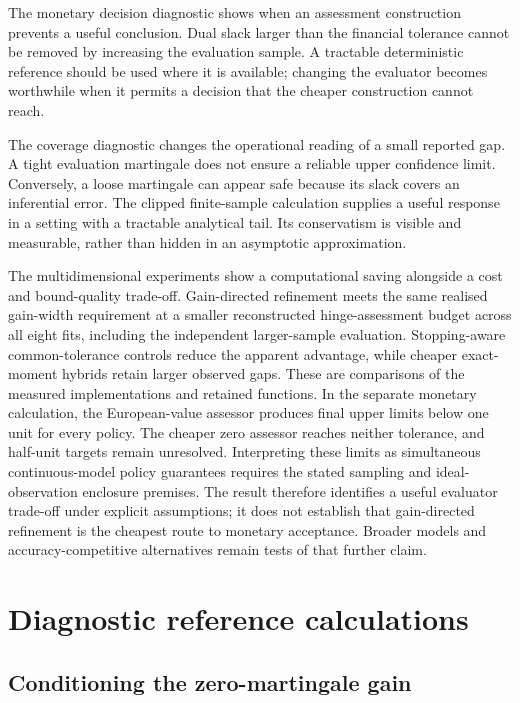 \documentclass[11pt]{article}
\begin{document}
The monetary decision diagnostic shows when an assessment construction prevents a useful conclusion. Dual slack larger than the financial tolerance cannot be removed by increasing the evaluation sample. A tractable deterministic reference should be used where it is available; changing the evaluator becomes worthwhile when it permits a decision that the cheaper construction cannot reach.

The coverage diagnostic changes the operational reading of a small reported gap. A tight evaluation martingale does not ensure a reliable upper confidence limit. Conversely, a loose martingale can appear safe because its slack covers an inferential error. The clipped finite-sample calculation supplies a useful response in a setting with a tractable analytical tail. Its conservatism is visible and measurable, rather than hidden in an asymptotic approximation.

The multidimensional experiments show a computational saving alongside a cost and bound-quality trade-off. Gain-directed refinement meets the same realised gain-width requirement at a smaller reconstructed hinge-assessment budget across all eight fits, including the independent larger-sample evaluation. Stopping-aware common-tolerance controls reduce the apparent advantage, while cheaper exact-moment hybrids retain larger observed gaps. These are comparisons of the measured implementations and retained functions. In the separate monetary calculation, the European-value assessor produces final upper limits below one unit for every policy. The cheaper zero assessor reaches neither tolerance, and half-unit targets remain unresolved. Interpreting these limits as simultaneous continuous-model policy guarantees requires the stated sampling and ideal-observation enclosure premises. The result therefore identifies a useful evaluator trade-off under explicit assumptions; it does not establish that gain-directed refinement is the cheapest route to monetary acceptance. Broader models and accuracy-competitive alternatives remain tests of that further claim.

\clearpage
\appendix
{}
\section{Diagnostic reference calculations}
\label{app:diagnostic-calculations}

\subsection{Conditioning the zero-martingale gain}
\end{document}
